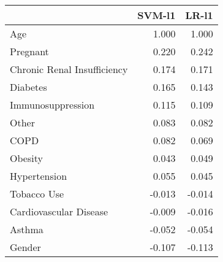 \begin{tabular}{lrr}
\toprule
{} &  SVM-l1 &  LR-l1 \\
\midrule
Age                         &   1.000 &  1.000 \\
Pregnant                    &   0.220 &  0.242 \\
Chronic Renal Insufficiency &   0.174 &  0.171 \\
Diabetes                    &   0.165 &  0.143 \\
Immunosuppression           &   0.115 &  0.109 \\
Other                       &   0.083 &  0.082 \\
COPD                        &   0.082 &  0.069 \\
Obesity                     &   0.043 &  0.049 \\
Hypertension                &   0.055 &  0.045 \\
Tobacco Use                 &  -0.013 & -0.014 \\
Cardiovascular Disease      &  -0.009 & -0.016 \\
Asthma                      &  -0.052 & -0.054 \\
Gender                      &  -0.107 & -0.113 \\
\bottomrule
\end{tabular}
